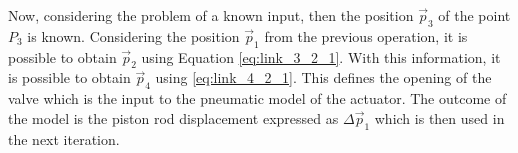     Now, considering the problem of a known input, then the position $\vec{p}_3$ of the point $P_3$ is known. Considering the position $\vec{p}_1$ from the previous operation, it is possible to obtain $\vec{p}_2$ using Equation \ref{eq:link_3_2_1}. With this information, it is possible to obtain $\vec{p}_4$ using \ref{eq:link_4_2_1}. This defines the opening of the valve which is the input to the pneumatic model of the actuator. The outcome of the model is the piston rod displacement expressed as $\Delta \vec{p}_1$ which is then used in the next iteration.